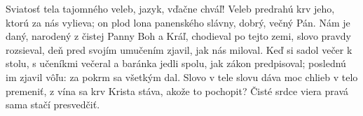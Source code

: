 Sviatosť tela tajomného veleb, jazyk, vďačne chváľ! 
Veleb predrahú krv jeho, ktorú za nás vylieva; 
on plod lona panenského slávny, dobrý, večný Pán. 
\versseparator
Nám je daný, narodený z čistej Panny Boh a Kráľ, 
chodieval po tejto zemi, slovo pravdy rozsieval, 
deň pred svojím umučením zjavil, jak nás miloval. 
\versseparator      
Keď si sadol večer k stolu, s učeníkmi večeral 
a baránka jedli spolu, jak zákon predpisoval; 
poslednú im zjavil vôľu: za pokrm sa všetkým dal. 
\versseparator
Slovo v tele slovu dáva moc chlieb v telo premeniť, 
z vína sa krv Krista stáva, akože to pochopit? 
Čisté srdce viera pravá sama stačí presvedčiť.